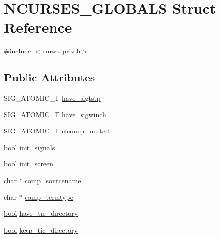 \hypertarget{struct_n_c_u_r_s_e_s___g_l_o_b_a_l_s}{\section{N\-C\-U\-R\-S\-E\-S\-\_\-\-G\-L\-O\-B\-A\-L\-S Struct Reference}
\label{struct_n_c_u_r_s_e_s___g_l_o_b_a_l_s}
}


{\ttfamily \#include $<$curses.\-priv.\-h$>$}

\subsection*{Public Attributes}
\begin{DoxyCompactItemize}
\item 
S\-I\-G\-\_\-\-A\-T\-O\-M\-I\-C\-\_\-\-T \hyperlink{struct_n_c_u_r_s_e_s___g_l_o_b_a_l_s_ab5e376d7b0b43247f9247404998d3f82}{have\-\_\-sigtstp}
\item 
S\-I\-G\-\_\-\-A\-T\-O\-M\-I\-C\-\_\-\-T \hyperlink{struct_n_c_u_r_s_e_s___g_l_o_b_a_l_s_a98d4f6c6f024a642553f37a8da3feb85}{have\-\_\-sigwinch}
\item 
S\-I\-G\-\_\-\-A\-T\-O\-M\-I\-C\-\_\-\-T \hyperlink{struct_n_c_u_r_s_e_s___g_l_o_b_a_l_s_aaf941ca638bdb38c08fbb378c435c83a}{cleanup\-\_\-nested}
\item 
\hyperlink{term__entry_8h_a002004ba5d663f149f6c38064926abac}{bool} \hyperlink{struct_n_c_u_r_s_e_s___g_l_o_b_a_l_s_a668cd875691bc354fa90701e420557a9}{init\-\_\-signals}
\item 
\hyperlink{term__entry_8h_a002004ba5d663f149f6c38064926abac}{bool} \hyperlink{struct_n_c_u_r_s_e_s___g_l_o_b_a_l_s_a1c808de308a90ad58786884d68603f61}{init\-\_\-screen}
\item 
char $\ast$ \hyperlink{struct_n_c_u_r_s_e_s___g_l_o_b_a_l_s_a5e85aa89bdb116dfa1bf7a7adbd63b50}{comp\-\_\-sourcename}
\item 
char $\ast$ \hyperlink{struct_n_c_u_r_s_e_s___g_l_o_b_a_l_s_ace629d9f4d09cd964ef3795ad9fab55b}{comp\-\_\-termtype}
\item 
\hyperlink{term__entry_8h_a002004ba5d663f149f6c38064926abac}{bool} \hyperlink{struct_n_c_u_r_s_e_s___g_l_o_b_a_l_s_a6010908c0de11e3e4852c246f270d073}{have\-\_\-tic\-\_\-directory}
\item 
\hyperlink{term__entry_8h_a002004ba5d663f149f6c38064926abac}{bool} \hyperlink{struct_n_c_u_r_s_e_s___g_l_o_b_a_l_s_a360e65dede95d02b51768a75595a4e22}{keep\-\_\-tic\-\_\-directory}

\end{DoxyCompactItemize}
